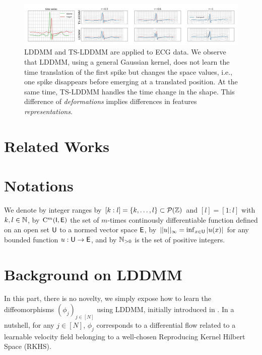 \begin{figure}[t]
  \centering
  \includegraphics[width=\linewidth]{"./pictures/transport.jpeg"}
  
  \caption{LDDMM and TS-LDDMM are applied to ECG data.
  We observe that LDDMM, using a general Gaussian kernel, does not learn the time translation of the first spike but changes the space values, i.e., one spike disappears before emerging at a translated position. At the same time, TS-LDDMM handles the time change in the shape.
  This difference of \textit{deformations} implies differences in features \textit{representations}.   }
  \label{fig:transport}
  
\end{figure}

\section{Related Works}
\section{Notations}
We denote by integer ranges by $[k:l]=\{k,\ldots,l\}\subset \mathcal{P}(\mathbb{Z})$ and $ [l]=[1:l]$ with $k,l\in \mathbb{N}$,
by $\mathrm{C}^m(\mathsf{I},\mathsf{E})$ the set of $m$-times continously differentiable function defined on an open set $\mathsf{U}$ to a normed vector space $\mathsf{E}$,
 by $||u||_\infty=\inf_{x\in \mathsf{U}} |u(x)| $ for any bounded function $u:\mathsf{U} \to \mathsf{E}$,
and by $\mathbb{N}_{>0}$ is the set of positive integers. 

\section{Background on LDDMM}
\label{section:LDDMM}

In this part, there is no novelty, we simply expose how to
 learn the diffeomorphisms $(\phi_j)_{j\in[N]}$ using LDDMM, initially introduced in \cite{beg2005computing}.
  In a nutshell, for any $j\in [N]$, $\phi_j$ corresponds to a differential flow related to a learnable velocity field belonging to a well-chosen Reproducing Kernel Hilbert Space (RKHS).

